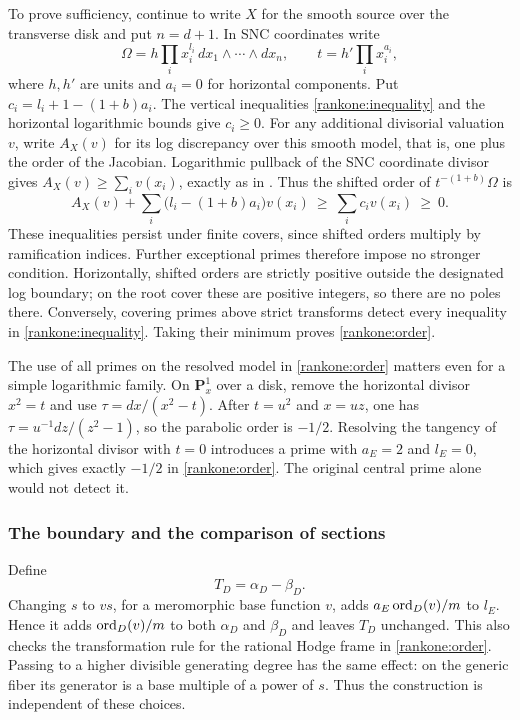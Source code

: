 To prove sufficiency, continue to write $X$ for the smooth source
over the transverse disk and put $n=d+1$.  In SNC coordinates write
\[
 \Omega=h\prod_i x_i^{l_i}\,dx_1\wedge\cdots\wedge dx_n,
 \qquad t=h'\prod_i x_i^{a_i},
\]
where $h,h'$ are units and $a_i=0$ for horizontal components.
Put $c_i=l_i+1-(1+b)a_i$.  The vertical inequalities
\eqref{rankone:inequality} and the horizontal logarithmic bounds
give $c_i\geq0$.  For any additional divisorial valuation $v$,
write $A_X(v)$ for its log discrepancy over this smooth model,
that is, one plus the order of the Jacobian.  Logarithmic pullback
of the SNC coordinate divisor gives
$A_X(v)\geq\sum_i v(x_i)$, exactly as in
.  Thus the shifted order of
$t^{-(1+b)}\Omega$ is
\[
 A_X(v)+\sum_i\bigl(l_i-(1+b)a_i\bigr)v(x_i)
 \ \geq\ \sum_i c_i v(x_i)\ \geq\ 0.
\]
These inequalities persist under finite covers, since shifted orders
multiply by ramification indices.  Further exceptional primes therefore
impose no stronger condition.
Horizontally, shifted orders are strictly positive outside the
designated log boundary; on the root cover these are positive
integers, so there are no poles there.  Conversely, covering primes
above strict transforms detect every
inequality in \eqref{rankone:inequality}.  Taking their minimum
proves \eqref{rankone:order}.

\begin{remark}\label{rankone:collision}
The use of all primes on the resolved model in
\eqref{rankone:order} matters even for a simple logarithmic
family.  On $\mathbf P^1_x$ over a disk, remove the horizontal
divisor $x^2=t$ and use $\tau=dx/(x^2-t)$.  After $t=u^2$ and
$x=uz$, one has $\tau=u^{-1}dz/(z^2-1)$, so the parabolic order
is $-1/2$.  Resolving the tangency of the horizontal divisor with
$t=0$ introduces a prime with $a_E=2$ and $l_E=0$, which gives
exactly $-1/2$ in \eqref{rankone:order}.  The original central
prime alone would not detect it.
\end{remark}

\subsubsection{The boundary and the comparison of sections}

Define
\begin{equation}\label{rankone:alpha-T}
 T_D=\alpha_D-\beta_D.
\end{equation}
Changing $s$ to $v s$, for a meromorphic base function $v$, adds
$a_E\operatorname{ord}_D(v)/m$ to $l_E$.  Hence it adds
$\operatorname{ord}_D(v)/m$ to both $\alpha_D$ and $\beta_D$ and leaves
$T_D$ unchanged.  This also checks the transformation rule for
the rational Hodge frame in \eqref{rankone:order}.  Passing to
a higher divisible generating degree has the same effect: on the
generic fiber its generator is a base multiple of a power of $s$.
Thus the construction is independent of these choices.


